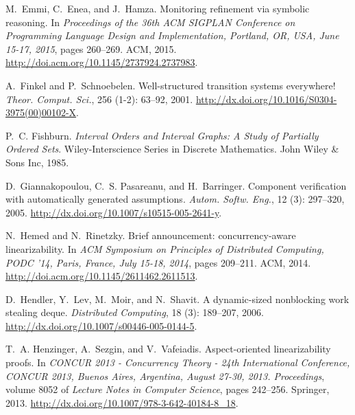 \documentclass[9pt,natbib,authoryear]{sigplanconf}
\begin{document}
\begin{thebibliography}{26}
M.~Emmi, C.~Enea, and J.~Hamza.
\newblock Monitoring refinement via symbolic reasoning.
\newblock In \emph{Proceedings of the 36th {ACM} {SIGPLAN} Conference on
  Programming Language Design and Implementation, Portland, OR, USA, June
  15-17, 2015}, pages 260--269. {ACM}, 2015.
\newblock \url{http://doi.acm.org/10.1145/2737924.2737983}.

A.~Finkel and P.~Schnoebelen.
\newblock Well-structured transition systems everywhere!
\newblock \emph{Theor. Comput. Sci.}, 256 (1-2): 63--92,
  2001.
\newblock \url{http://dx.doi.org/10.1016/S0304-3975(00)00102-X}.

P.~C. Fishburn.
\newblock \emph{Interval Orders and Interval Graphs: A Study of Partially
  Ordered Sets}.
\newblock Wiley-Interscience Series in Discrete Mathematics. John Wiley \& Sons
  Inc, 1985.

D.~Giannakopoulou, C.~S. Pasareanu, and H.~Barringer.
\newblock Component verification with automatically generated assumptions.
\newblock \emph{Autom. Softw. Eng.}, 12 (3): 297--320, 2005.
\newblock \url{http://dx.doi.org/10.1007/s10515-005-2641-y}.

N.~Hemed and N.~Rinetzky.
\newblock Brief announcement: concurrency-aware linearizability.
\newblock In \emph{{ACM} Symposium on Principles of Distributed Computing,
  {PODC} '14, Paris, France, July 15-18, 2014}, pages 209--211. {ACM}, 2014.
\newblock \url{http://doi.acm.org/10.1145/2611462.2611513}.

D.~Hendler, Y.~Lev, M.~Moir, and N.~Shavit.
\newblock A dynamic-sized nonblocking work stealing deque.
\newblock \emph{Distributed Computing}, 18 (3): 189--207,
  2006.
\newblock \url{http://dx.doi.org/10.1007/s00446-005-0144-5}.

T.~A. Henzinger, A.~Sezgin, and V.~Vafeiadis.
\newblock Aspect-oriented linearizability proofs.
\newblock In \emph{{CONCUR} 2013 - Concurrency Theory - 24th International
  Conference, {CONCUR} 2013, Buenos Aires, Argentina, August 27-30, 2013.
  Proceedings}, volume 8052 of \emph{Lecture Notes in Computer Science}, pages
  242--256. Springer, 2013.
\newblock \url{http://dx.doi.org/10.1007/978-3-642-40184-8_18}.


\end{thebibliography}
\end{document}
